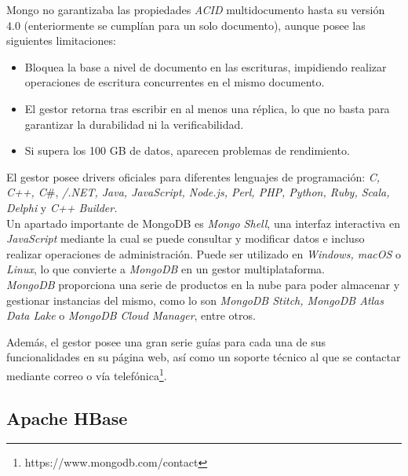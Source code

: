 \documentclass[3pt]{article}
\begin{document}
Mongo no garantizaba las propiedades \emph{ACID} multidocumento hasta su versión 4.0 (enteriormente se cumplían para un solo documento), aunque posee las siguientes limitaciones\cite{WIKI:15}: 

\begin{itemize}
	\item Bloquea la base a nivel de documento en las escrituras, impidiendo realizar operaciones de escritura concurrentes en el mismo documento. 
	\item El gestor retorna tras escribir en al menos una réplica, lo que no basta para garantizar la durabilidad ni la verificabilidad.\cite{MDB:9}
	\item Si supera los 100 GB de datos, aparecen problemas de rendimiento.\cite{MDB:10}
\end{itemize}

El gestor posee drivers oficiales para diferentes lenguajes de programación: \emph{C, C++, C}\#, \emph{/.NET, Java, JavaScript, Node.js, Perl, PHP, Python, Ruby, Scala, Delphi} y \emph{C++ Builder.}\\

Un apartado importante de MongoDB es \emph{Mongo Shell}\cite{MDB:6}, una interfaz interactiva en \emph{JavaScript} mediante la cual se puede consultar y modificar datos e incluso realizar operaciones de administración. Puede ser utilizado en \emph{Windows, macOS} o \emph{Linux}, lo que convierte a \emph{MongoDB} en un gestor multiplataforma.\\

\emph{MongoDB} proporciona una serie de productos en la nube para poder almacenar y gestionar instancias del mismo, como lo son \emph{MongoDB Stitch, MongoDB Atlas Data Lake} o \emph{MongoDB Cloud Manager}, entre otros.\cite{MDB:7}

Además, el gestor posee una gran serie guías para cada una de sus funcionalidades en su página web\cite{MDB:8}, así como un soporte técnico al que se contactar mediante correo o vía telefónica\footnote{https://www.mongodb.com/contact}.

\subsection{Apache HBase}
\end{document}
